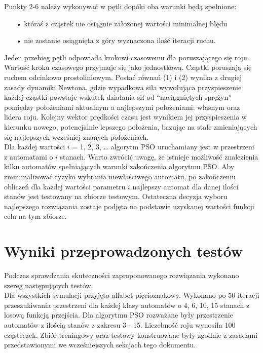 \documentclass[runningheads,a4paper]{llncs}
\begin{document}
Punkty 2-6 należy wykonywać w pętli dopóki oba warunki będą spełnione:

\begin{itemize}
\item[•] któraś z cząstek nie osiągnie założonej wartości minimalnej błędu
\item[•] nie zostanie osiągnięta z góry wyznaczona ilość iteracji ruchu.
\end{itemize}

Jeden przebieg pętli odpowiada krokowi czasowemu dla poruszającego się roju. Wartość kroku czasowego przyjmuje się jako jednostkową.
Cząstki poruszają się ruchem odcinkowo prostoliniowym. Postać równań (1) i (2) wynika z drugiej zasady dynamiki Newtona, gdzie wypadkowa siła wywołująca przyspieszenie każdej cząstki powstaje wskutek działania sił od “naciągniętych sprężyn” pomiędzy położeniami aktualnym a najlepszymi położeniami: własnym oraz lidera roju. Kolejny wektor prędkości czasu jest wynikiem jej przyspieszenia w kierunku nowego, potencjalnie lepszego położenia, bazując na stale zmieniających się najlepszych wcześniej znanych położeniach.\\

Dla każdej wartości $i$ = 1, 2, 3, …  algorytm PSO uruchamiany jest w przestrzeni z automatami o $i$ stanach. Warto zwrócić uwagę, że istnieje możliwość znalezienia kilku automatów spełniających warunki zakończenia algorytmu PSO. Aby zminimalizować ryzyko wybrania niewłaściwego automatu, po zakończeniu obliczeń dla każdej wartości parametru $i$ najlepszy automat dla danej ilości stanów jest testowany na zbiorze testowym. Ostateczna decyzja wyboru najlepszego rozwiązania zostaje podjęta na podstawie uzyskanej wartości funkcji celu na tym zbiorze.

\newpage

\FloatBarrier
\section{Wyniki przeprowadzonych testów}

Podczas sprawdzania skuteczności zaproponowanego rozwiązania wykonano szereg następujących testów. \\

Dla wszystkich symulacji przyjęto alfabet pięcioznakowy. Wykonano po 50 iteracji przeszukiwania przestrzeni dla każdej klasy automatów o 4, 6, 10, 15 stanach z losową funkcją przejścia. Dla algorytmu PSO rozważane były przestrzenie automatów z ilością stanów z zakresu 3 - 15. Liczebność roju wynosiła 100 cząsteczek. Zbiór treningowy oraz testowy konstruowane były zgodnie z zasadami przedstawionymi we wcześniejszych sekcjach tego dokumentu. \\
\end{document}
